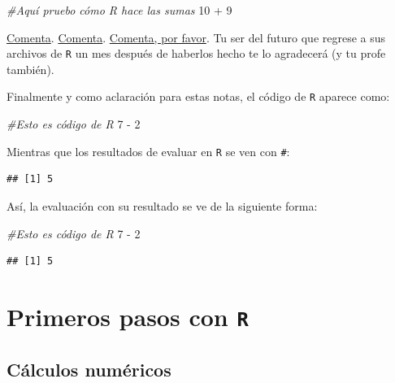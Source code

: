 \documentclass[]{tufte-book}
\newenvironment{Shaded}{}{}
\newcommand{\CommentTok}[1]{\textcolor[rgb]{0.38,0.63,0.69}{\textit{#1}}}
\newcommand{\DecValTok}[1]{\textcolor[rgb]{0.25,0.63,0.44}{#1}}
\newcommand{\SpecialCharTok}[1]{\textcolor[rgb]{0.25,0.44,0.63}{#1}}
\begin{document}
\begin{Shaded}
\begin{Highlighting}[]
\CommentTok{\#Aquí pruebo cómo R hace las sumas}
\DecValTok{10} \SpecialCharTok{+} \DecValTok{9}
\end{Highlighting}
\end{Shaded}

\href{https://www.freecodecamp.org/news/code-comments-the-good-the-bad-and-the-ugly-be9cc65fbf83/}{Comenta}.
\href{https://www.c-sharpcorner.com/blogs/why-comments-are-important-while-writing-a-code}{Comenta}.
\href{https://blog.codinghorror.com/code-tells-you-how-comments-tell-you-why/}{Comenta,
por favor}. Tu ser del futuro que regrese a sus archivos de \texttt{R}
un mes después de haberlos hecho te lo agradecerá (y tu profe también).

Finalmente y como aclaración para estas notas, el código de \texttt{R}
aparece como:

\begin{Shaded}
\begin{Highlighting}[]
\CommentTok{\#Esto es código de R}
\DecValTok{7} \SpecialCharTok{{-}} \DecValTok{2}
\end{Highlighting}
\end{Shaded}

Mientras que los resultados de evaluar en \texttt{R} se ven con
\texttt{\#}:

\begin{verbatim}
## [1] 5
\end{verbatim}

Así, la evaluación con su resultado se ve de la siguiente forma:

\begin{Shaded}
\begin{Highlighting}[]
\CommentTok{\#Esto es código de R}
\DecValTok{7} \SpecialCharTok{{-}} \DecValTok{2}
\end{Highlighting}
\end{Shaded}

\begin{verbatim}
## [1] 5
\end{verbatim}

\hypertarget{primeros-pasos-con-r}{%
\chapter{\texorpdfstring{Primeros pasos con
\texttt{R}}{Primeros pasos con R}}\label{primeros-pasos-con-r}}

\hypertarget{cuxe1lculos-numuxe9ricos}{%
\section{Cálculos numéricos}\label{cuxe1lculos-numuxe9ricos}}
\end{document}

